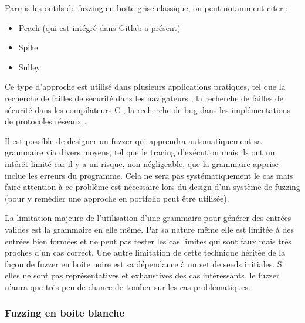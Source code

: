 \documentclass[a4paper]{report}
\begin{document}
Parmis les outils de fuzzing en boite grise classique, on peut notamment citer \cite{sutton2007fuzzing}:
\begin{itemize}
\item Peach (qui est intégré dans Gitlab a présent) \cite{peach}
\item Spike \cite{spike}
\item Sulley \cite{sulley}
\end{itemize}




Ce type d'approche est utilisé dans plusieurs applications pratiques, tel que la recherche de failles de sécurité dans les navigateurs \cite{holler2012fuzzing}, la recherche de failles de sécurité dans les compilateurs C \cite{yang2011finding}, la recherche de bug dans les implémentations de protocoles réseaux \cite{aflnet}.


Il est possible de designer un fuzzer qui apprendra automatiquement sa grammaire via divers moyens, tel que le tracing d'exécution \cite{hoschele2017mining} mais ils ont un intérêt limité car il y a un risque, non-négligeable, que la grammaire apprise inclue les erreurs du programme.
Cela ne sera pas systématiquement le cas mais faire attention à ce problème est nécessaire lors du design d'un système de fuzzing (pour y remédier une approche en portfolio peut être utilisée).

La limitation majeure de l'utilisation d'une grammaire pour générer des entrées valides est la grammaire en elle même.
Par sa nature même elle est limitée à des entrées bien formées et ne peut pas tester les cas limites qui sont faux mais très proches d'un cas correct.
Une autre limitation de cette technique héritée de la façon de fuzzer en boite noire est sa dépendance à un set de seeds initiales.
Si elles ne sont pas représentatives et exhaustives des cas intéressants, le fuzzer n'aura que très peu de chance de tomber sur les cas problématiques.

\subsubsection{Fuzzing en boite blanche}
\end{document}
